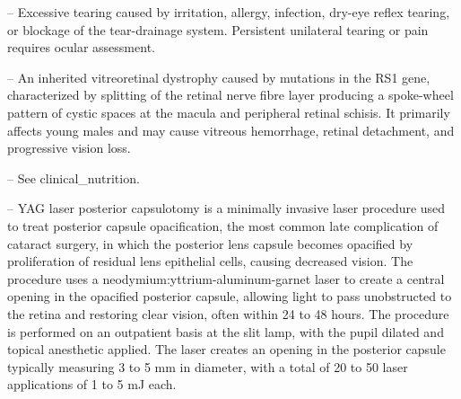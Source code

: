 -- Excessive tearing caused by irritation, allergy, infection, dry-eye reflex tearing, or blockage of the tear-drainage system. Persistent unilateral tearing or pain requires ocular assessment.

-- An inherited vitreoretinal dystrophy caused by mutations in the RS1 gene, characterized by splitting of the retinal nerve fibre layer producing a spoke-wheel pattern of cystic spaces at the macula and peripheral retinal schisis. It primarily affects young males and may cause vitreous hemorrhage, retinal detachment, and progressive vision loss.

-- See clinical\_nutrition.

-- YAG laser posterior capsulotomy is a minimally invasive laser procedure used to treat posterior capsule opacification, the most common late complication of cataract surgery, in which the posterior lens capsule becomes opacified by proliferation of residual lens epithelial cells, causing decreased vision. The procedure uses a neodymium:yttrium-aluminum-garnet laser to create a central opening in the opacified posterior capsule, allowing light to pass unobstructed to the retina and restoring clear vision, often within 24 to 48 hours. The procedure is performed on an outpatient basis at the slit lamp, with the pupil dilated and topical anesthetic applied. The laser creates an opening in the posterior capsule typically measuring 3 to 5 mm in diameter, with a total of 20 to 50 laser applications of 1 to 5 mJ each.
